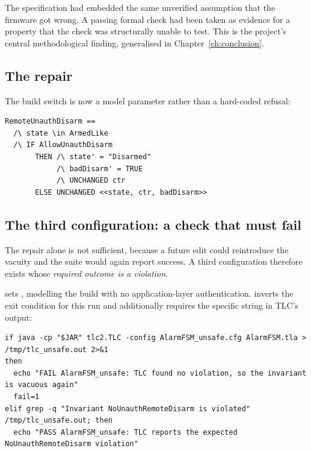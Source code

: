 The specification had embedded the same unverified assumption that the firmware got wrong. A
passing formal check had been taken as evidence for a property that the check was structurally
unable to test. This is the project's central methodological finding, generalised in
Chapter~\ref{ch:conclusion}.

\subsection{The repair}

The build switch is now a model parameter rather than a hard-coded refusal:

\begin{lstlisting}[style=tla,caption={The repaired action: the configuration is a parameter, so
the violating behaviour exists and is reachable under one valuation.},label={lst:repaired}]
RemoteUnauthDisarm ==
  /\ state \in ArmedLike
  /\ IF AllowUnauthDisarm
       THEN /\ state' = "Disarmed"
            /\ badDisarm' = TRUE
            /\ UNCHANGED ctr
       ELSE UNCHANGED <<state, ctr, badDisarm>>
\end{lstlisting}

\subsection{The third configuration: a check that must fail}

The repair alone is not sufficient, because a future edit could reintroduce the vacuity and the
suite would again report success. A third configuration therefore exists whose \emph{required
outcome is a violation}.

 sets , modelling the
 build with no application-layer authentication.
 inverts the exit condition for this run and additionally requires the
specific string  in TLC's output:

\begin{lstlisting}[style=sh,caption={The inverted check. A \emph{passing} TLC run is treated as a
build failure.},label={lst:invertedcheck}]
if java -cp "$JAR" tlc2.TLC -config AlarmFSM_unsafe.cfg AlarmFSM.tla > /tmp/tlc_unsafe.out 2>&1
then
  echo "FAIL AlarmFSM_unsafe: TLC found no violation, so the invariant is vacuous again"
  fail=1
elif grep -q "Invariant NoUnauthRemoteDisarm is violated" /tmp/tlc_unsafe.out; then
  echo "PASS AlarmFSM_unsafe: TLC reports the expected NoUnauthRemoteDisarm violation"
\end{lstlisting}

